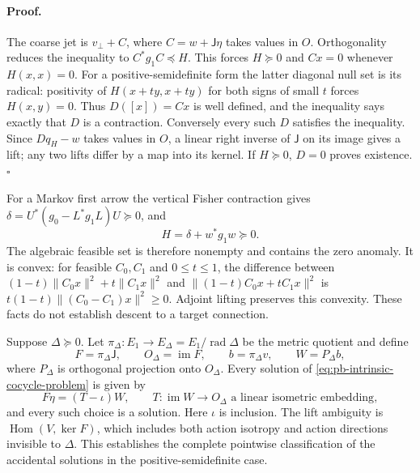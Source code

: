 \paragraph{Proof.}
The coarse jet is $v_\perp+C$, where $C=w+\mathsf J\eta$ takes values in
$O$. Orthogonality reduces the inequality to $C^*g_1C\preceq H$.
This forces $H\succeq0$ and $Cx=0$ whenever $H(x,x)=0$.
For a positive-semidefinite form the latter diagonal null set is its
radical: positivity of $H(x+ty,x+ty)$ for both signs of small $t$ forces
$H(x,y)=0$. Thus $D([x])=Cx$ is well defined, and the inequality says
exactly that $D$ is a contraction. Conversely every such $D$ satisfies
the inequality. Since $Dq_H-w$ takes values in $O$, a linear right inverse
of $\mathsf J$ on its image gives a lift; any two lifts differ by a map
into its kernel. If $H\succeq0$, $D=0$ proves existence. $\square$

For a Markov first arrow the vertical Fisher contraction gives
$\delta=U^*(g_0-L^*g_1L)U\succeq0$, and
\begin{equation}
H=\delta+w^*g_1w\succeq0.
\label{eq:pb-defect-markov-budget}
\end{equation}
The algebraic feasible set is therefore nonempty and contains the zero
anomaly. It is convex: for feasible $C_0,C_1$ and $0\leq t\leq1$,
the difference between
$(1-t)\|C_0x\|^2+t\|C_1x\|^2$ and
$\|(1-t)C_0x+tC_1x\|^2$ is
$t(1-t)\|(C_0-C_1)x\|^2\geq0$. Adjoint lifting preserves this convexity.
These facts do not establish descent to a target connection.

Suppose $\Delta\succeq0$. Let
$\pi_\Delta:E_1\to E_\Delta=E_1/\operatorname{rad}\Delta$ be the metric
quotient and define
\begin{equation}
F=\pi_\Delta\mathsf J,\qquad
O_\Delta=\operatorname{im}F,\qquad
b=\pi_\Delta v,\qquad W=P_\Delta b,
\label{eq:pb-defect-cocycle-quotient-data}
\end{equation}
where $P_\Delta$ is orthogonal projection onto $O_\Delta$.
Every solution of \eqref{eq:pb-intrinsic-cocycle-problem} is given by
\begin{equation}
F\eta=(T-\iota)W,\qquad
T:\operatorname{im}W\longrightarrow O_\Delta
\text{ a linear isometric embedding},
\label{eq:pb-defect-isometry-parameterization}
\end{equation}
and every such choice is a solution. Here $\iota$ is inclusion.
The lift ambiguity is $\operatorname{Hom}(V,\ker F)$, which includes
both action isotropy and action directions invisible to $\Delta$.
This establishes the complete pointwise classification of the accidental
solutions in the positive-semidefinite case. 

